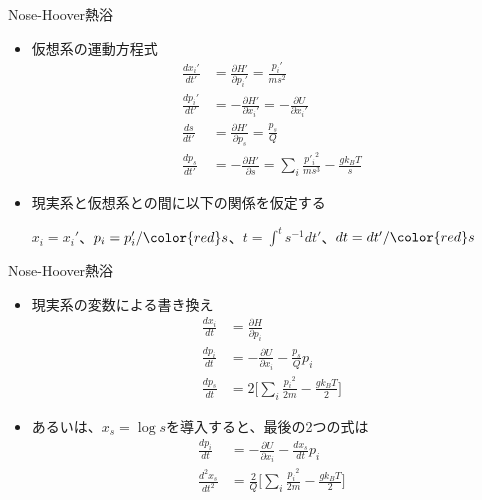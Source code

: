 \begin{frame}[t,fragile]{Nose-Hoover熱浴}
  \begin{itemize}
  \item 仮想系の運動方程式
    \begin{align*}
      \frac{dx_i'}{dt'} &= \frac{\partial H'}{\partial p_i'} = \frac{p_i'}{ms^2} \\
      \frac{dp_i'}{dt'} &= -\frac{\partial H'}{\partial x_i'} = -\frac{\partial U}{\partial x_i'} \\
      \frac{ds}{dt'} &= \frac{\partial H'}{\partial p_s} = \frac{p_s}{Q} \\
      \frac{dp_s}{dt'} &= -\frac{\partial H'}{\partial s} = \sum_i \frac{{p'_i}^2}{ms^3} - \frac{g k_B T}{s}
    \end{align*}
  \item 現実系と仮想系との間に以下の関係を仮定する

    $x_i=x_i'$、$p_i=p_i'/{\color{red}s}$、$t=\int^t s^{-1} dt'$、$dt=dt'/{\color{red}s}$
  \end{itemize}
\end{frame}

\begin{frame}[t,fragile]{Nose-Hoover熱浴}
  \begin{itemize}
  \item 現実系の変数による書き換え
    \begin{align*}
      \frac{dx_i}{dt} &= \frac{\partial H}{\partial p_i} \\
      \frac{dp_i}{dt} &= -\frac{\partial U}{\partial x_i} -\frac{p_s}{Q} p_i \\
      \frac{dp_s}{dt} &= 2 \big[ \sum_i \frac{{p_i}^2}{2m} - \frac{g k_B T}{2} \big]
    \end{align*}
  \item あるいは、$x_s = \log s$を導入すると、最後の2つの式は
    \begin{align*}
      \frac{dp_i}{dt} &= -\frac{\partial U}{\partial x_i} -\frac{dx_s}{dt} p_i \\
      \frac{d^2x_s}{dt^2} &= \frac{2}{Q} \big[ \sum_i \frac{{p_i}^2}{2m} - \frac{g k_B T}{2} \big]
    \end{align*}
  \end{itemize}
\end{frame}

